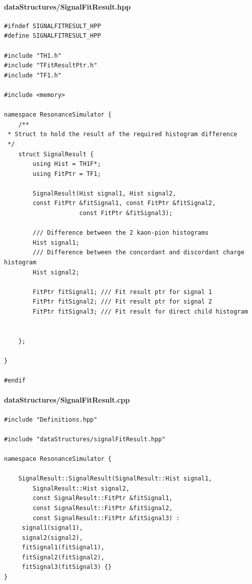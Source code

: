 \documentclass[12pt, a4paper]{article}
\begin{document}
\paragraph{dataStructures/SignalFitResult.hpp}

\begin{verbatim}
#ifndef SIGNALFITRESULT_HPP
#define SIGNALFITRESULT_HPP

#include "TH1.h"
#include "TFitResultPtr.h"
#include "TF1.h"

#include <memory>

namespace ResonanceSimulator {
    /**
 * Struct to hold the result of the required histogram difference
 */
    struct SignalResult {
        using Hist = TH1F*;
        using FitPtr = TF1;

        SignalResult(Hist signal1, Hist signal2, 
        const FitPtr &fitSignal1, const FitPtr &fitSignal2,
                     const FitPtr &fitSignal3);

		/// Difference between the 2 kaon-pion histograms
        Hist signal1;
        /// Difference between the concordant and discordant charge histogram
        Hist signal2; 
        
        FitPtr fitSignal1; /// Fit result ptr for signal 1
        FitPtr fitSignal2; /// Fit result ptr for signal 2
        FitPtr fitSignal3; /// Fit result for direct child histogram


    };

}

#endif
\end{verbatim}

\paragraph{dataStructures/SignalFitResult.cpp}
\begin{verbatim}
#include "Definitions.hpp"

#include "dataStructures/signalFitResult.hpp"

namespace ResonanceSimulator {

    SignalResult::SignalResult(SignalResult::Hist signal1, 
     	SignalResult::Hist signal2,
     	const SignalResult::FitPtr &fitSignal1, 
     	const SignalResult::FitPtr &fitSignal2,
     	const SignalResult::FitPtr &fitSignal3) : 
     signal1(signal1), 
     signal2(signal2),
     fitSignal1(fitSignal1), 
     fitSignal2(fitSignal2),
     fitSignal3(fitSignal3) {}
}
\end{verbatim}
\end{document}
